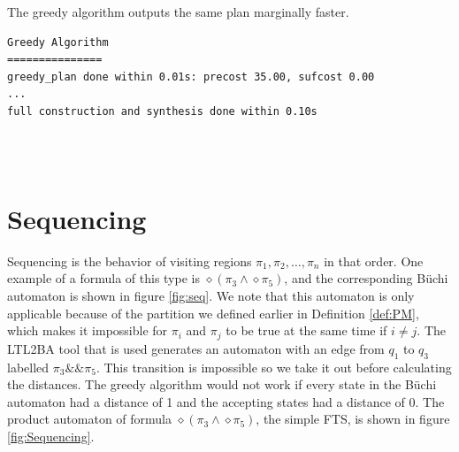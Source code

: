 The greedy algorithm outputs the same plan marginally faster. \\


\begin{minipage}{\textwidth}
\begingroup
\fontsize{9pt}{12pt}\selectfont
\begin{lstlisting}
Greedy Algorithm
===============
greedy_plan done within 0.01s: precost 35.00, sufcost 0.00
...
full construction and synthesis done within 0.10s 
\end{lstlisting}
\endgroup
\end{minipage} \\ \\


\section{Sequencing}
Sequencing is the behavior of visiting regions $\pi_1,\pi_2,\dots,\pi_n$ in that order. One example of a formula of this type is $\diamond (\pi_3 \land  \diamond \pi_5)$, and the corresponding B\"uchi automaton is shown in figure \ref{fig:seq}. We note that this automaton is only applicable because of the partition we defined earlier in Definition \ref{def:PM}, which makes it impossible for $\pi_i$ and $\pi_j$ to be true at the same time if $i\neq j$. The LTL2BA tool \cite{ltlbuchiwebsite} that is used generates an automaton with an edge from $q_1$ to $q_3$ labelled $\pi_3 \&\& \pi_5 $. This transition is impossible so we take it out before calculating the distances. The greedy algorithm would not work if every state in the B\"uchi automaton had a distance of 1 and the accepting states had a distance of 0. The product automaton of formula $\diamond (\pi_3 \wedge \diamond \pi_5)$, the simple FTS, is shown in figure \ref{fig:Sequencing}.


